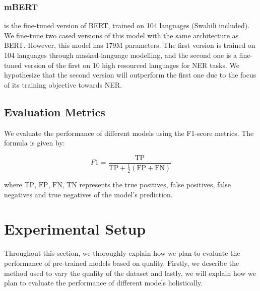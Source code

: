 \documentclass[11pt,a4paper]{article}
\begin{document}
\subsubsection*{mBERT} is the fine-tuned version of BERT, trained on 104 languages \cite{DBLP:journals/corr/abs-1911-03310} (Swahili included). We fine-tune two cased versions of this model with the same architecture as BERT. However, this model has 179M parameters. The first version is trained on 104 languages through masked-language modelling, and the second one is a fine-tuned version of the first on 10 high resourced languages for NER tasks. We hypothesize that the second version will outperform the first one due to the focus of its training objective towards NER.


\subsection{Evaluation Metrics}
We evaluate the performance of different models using the F1-score metrics. The formula is given by:

$$F1 = \frac{\mathrm{TP}}{\mathrm{TP}+\frac{1}{2}(\mathrm{FP}+\mathrm{FN})}$$

where $\mathrm{TP}$, $\mathrm{FP}$, $\mathrm{FN}$, $\mathrm{TN}$ represents the true positives, false positives, false negatives and true negatives of the model's prediction.

\section{Experimental Setup}
\label{sec:exp}
Throughout this section, we thoroughly explain how we plan to evaluate the performance of pre-trained models based on quality. Firstly, we describe the method used to vary the quality of the dataset and lastly, we will explain how we plan to evaluate the performance of different models holistically.
\end{document}
